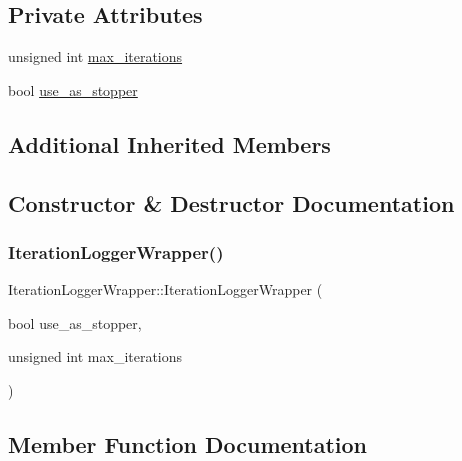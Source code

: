 \subsection*{Private Attributes}
\begin{DoxyCompactItemize}
\item 
unsigned int \mbox{\hyperlink{class_iteration_logger_wrapper_a558ed3722fe17ab31c6463e8dbda7ccc}{max\+\_\+iterations}}
\item 
bool \mbox{\hyperlink{class_iteration_logger_wrapper_ae3ae6a45a08aeb251ad15282ebc6794d}{use\+\_\+as\+\_\+stopper}}
\end{DoxyCompactItemize}
\subsection*{Additional Inherited Members}


\subsection{Constructor \& Destructor Documentation}
\mbox{\label{class_iteration_logger_wrapper_a7d4c0052811a3bbb921cdb31be2c77f5}} 
\subsubsection{\texorpdfstring{Iteration\+Logger\+Wrapper()}{IterationLoggerWrapper()}}
{\footnotesize\ttfamily Iteration\+Logger\+Wrapper\+::\+Iteration\+Logger\+Wrapper (\begin{DoxyParamCaption}\item[{bool}]{use\+\_\+as\+\_\+stopper,  }\item[{unsigned int}]{max\+\_\+iterations }\end{DoxyParamCaption})\hspace{0.3cm}{\ttfamily [inline]}}



\subsection{Member Function Documentation}
\mbox{\label{class_iteration_logger_wrapper_a8b5276c1c6bea1ee5fceac5d4b03acee}} 
